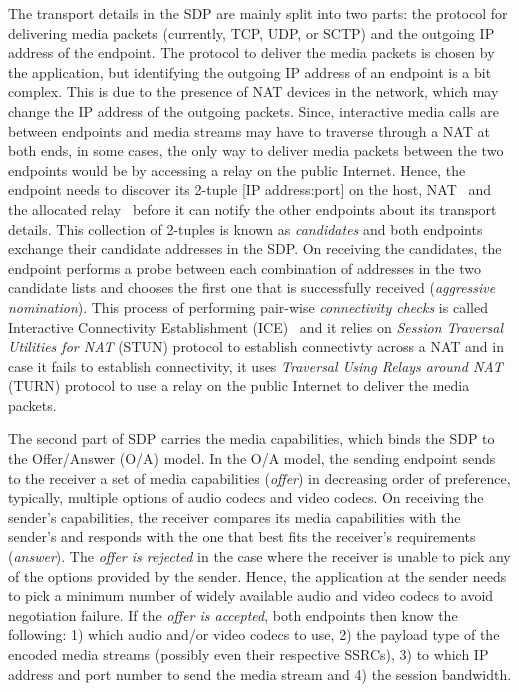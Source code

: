 The transport details in the SDP are mainly split into two parts: the protocol
for delivering media packets (currently, TCP, UDP, or SCTP) and the outgoing
IP address of the endpoint. The protocol to deliver the media packets is
chosen by the application, but identifying the outgoing IP address of an
endpoint is a bit complex. This is due to the presence of NAT devices in the
network, which may change the IP address of the outgoing packets. Since,
interactive media calls are between endpoints and media streams may have to
traverse through a NAT at both ends, in some cases, the only way to deliver
media packets between the two endpoints would be by accessing a relay on the
public Internet. Hence, the endpoint needs to discover its 2-tuple [IP
address:port] on the host, NAT~\cite{rfc5389} and the allocated
relay~\cite{rfc5766} before it can notify the other endpoints about its
transport details. This collection of 2-tuples is known as \emph{candidates}
and both endpoints exchange their candidate addresses in the SDP. On receiving
the candidates, the endpoint performs a probe between each combination of
addresses in the two candidate lists and chooses the first one that is
successfully received (\emph{aggressive nomination}). This process of
performing pair-wise \emph{connectivity checks} is called Interactive
Connectivity Establishment (ICE)~\cite{rfc5245, rfc6544} and it relies on
\emph{Session Traversal Utilities for NAT} (STUN) protocol to establish
connectivty across a NAT and in case it fails to establish connectivity, it
uses \emph{Traversal Using Relays around NAT} (TURN) protocol to use a relay
on the public Internet to deliver the media packets.


The second part of SDP carries the media capabilities, which binds the SDP to
the Offer/Answer (O/A) model. In the O/A model, the sending endpoint sends to
the receiver a set of media capabilities (\emph{offer}) in decreasing order of
preference, typically, multiple options of audio codecs and video codecs. On
receiving the sender's capabilities, the receiver compares its media
capabilities with the sender's and responds with the one that best fits the
receiver's requirements (\emph{answer}). The \emph{offer is rejected} in the
case where the receiver is unable to pick any of the options provided by the
sender. Hence, the application at the sender needs to pick a minimum number of
widely available audio and video codecs to avoid negotiation failure. If the
\emph{offer is accepted}, both endpoints then know the following: 1) which
audio and/or video codecs to use, 2) the payload type of the encoded media
streams (possibly even their respective SSRCs), 3) to which IP address and
port number to send the media stream and 4) the session bandwidth.
